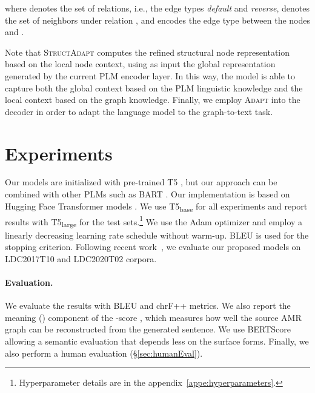\documentclass[11pt]{article}
\newcommand{\graphadapter}{{\small\textsc{StructAdapt}}\xspace}
\newcommand{\vanilladapter}{{\small\textsc{Adapt}}\xspace}
\begin{document}
where  denotes the set of relations, i.e., the edge types \emph{default} and \emph{reverse},  denotes the set of neighbors under relation , and  encodes the edge type between the nodes  and . 


Note that \graphadapter computes the refined structural node representation  based on the local node context, using as input the global representation  generated by the current PLM encoder layer. In this way, the model is able to capture both the global context based on the PLM linguistic knowledge and the local context based on the graph knowledge. Finally, we employ \vanilladapter into the decoder in order to adapt the language model to the graph-to-text task.
 


\section{Experiments}
\label{sec:exps}

Our models are initialized with pre-trained T5 \hbox{\cite{2019t5}}, but our approach can be combined with other PLMs such as BART \cite{lewis2019bart}. Our implementation is based on Hugging Face Transformer models \citep{wolf2019huggingfaces}. We use T5\textsubscript{base} for all experiments and report results with T5\textsubscript{large} for the test sets.\footnote{Hyperparameter details are in the appendix~\ref{appe:hyperparameters}.} We use the Adam optimizer \cite{kingma:adam} and employ a linearly decreasing learning rate schedule without warm-up. BLEU is used for the stopping criterion. Following recent work~\cite{mager2020gpttoo,zhang-etal-2020-lightweight}, we evaluate our proposed models on LDC2017T10 and LDC2020T02 corpora. 

\paragraph{Evaluation.} We evaluate the results with BLEU \cite{papineni-etal-2002-bleu} and chrF++ \cite{popovic-2015-chrf} metrics. We also report the meaning () component of the -score \cite{opitz-frank-2021-towards}, which measures how well the source AMR graph can be reconstructed from the generated sentence. We use BERTScore~\cite{bert-score} allowing a semantic evaluation that depends less on the surface forms. Finally, we also perform a human evaluation (\S\ref{sec:humanEval}).
\end{document}
